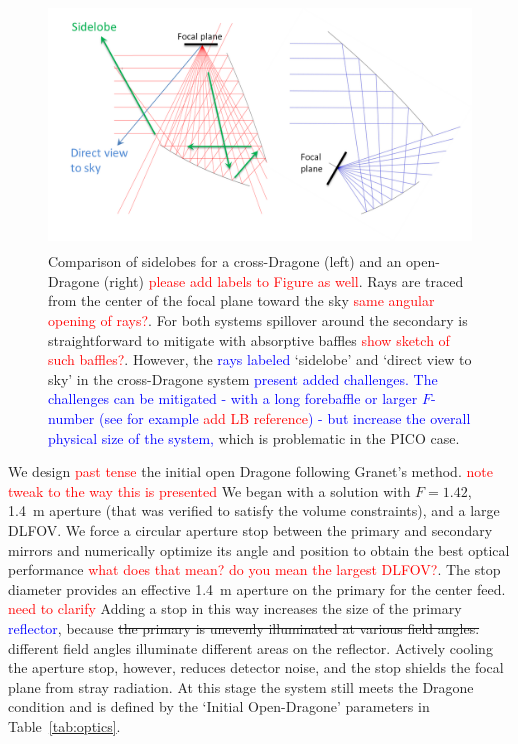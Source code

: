 \documentclass[]{spie}  %
\newcommand{\comr}[1]{\textcolor{red}{#1}}
\newcommand{\comb}[1]{\textcolor{blue}{#1}}
\begin{document}
\begin{figure} [ht]
\begin{center}
\includegraphics[height=6.5cm]{sidelobes.png}
\end{center}
\caption { \label{fig:sidelobes} 
Comparison of sidelobes for a cross-Dragone (left) and an open-Dragone (right) \comr{please add labels to Figure as well}.  
Rays are traced from the center of the focal plane toward the sky \comr{same angular opening of rays?}.
For both systems spillover around the secondary is straightforward to mitigate with absorptive baffles \comr{show sketch of such baffles?}.  
However, the \comb{rays labeled} `sidelobe' and `direct view to 
sky' in the cross-Dragone system \comb{present added challenges. The challenges can be mitigated - with a long forebaffle or larger $F$-number (see
for example \comr{add LB reference}) - but
increase the overall physical size of the system,} which is problematic in the PICO case.}
\end{figure} 

We design \comr{past tense} the initial open Dragone following Granet's method\cite{granet2001}. 
\comr{note tweak to the way this is presented} 
We began with a solution with $F=1.42$, 1.4~m aperture (that was verified to satisfy the volume constraints), and a large 
DLFOV.  We force a circular aperture stop 
between the primary and secondary mirrors and numerically optimize its angle and position to obtain the best 
optical performance \comr{what does that mean? do you mean the largest DLFOV?}.  The stop diameter provides an 
effective 1.4~m aperture on the primary for the center feed. \comr{need to clarify} 
Adding a stop in this way increases the size of the primary \comb{reflector}, because \sout{the primary is unevenly illuminated at various 
field angles.} different field angles illuminate different areas on the reflector.
Actively cooling the aperture stop, however, reduces detector noise, and the stop shields the 
focal plane from stray radiation. At this stage the system still meets 
the Dragone condition and is defined by the `Initial Open-Dragone' parameters in Table~\ref{tab:optics}.
\end{document}
